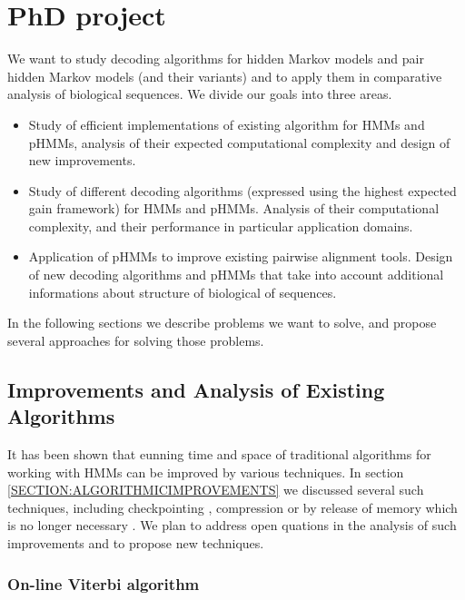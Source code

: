 \chapter{PhD project}

We want to study decoding algorithms for hidden Markov models and pair hidden
Markov models (and their variants) and to apply them in comparative analysis
of biological sequences. We divide our goals into three areas.
\begin{itemize}
\item Study of efficient implementations of existing algorithm for HMMs and
pHMMs, analysis of their expected computational complexity and design of  new
improvements.

\item Study of different decoding algorithms (expressed using the highest
expected gain framework) for HMMs and pHMMs. Analysis of their computational
complexity, and their performance in particular application domains.    

\item Application of pHMMs to improve existing pairwise alignment
tools. Design of new decoding algorithms and pHMMs that take into
account additional informations about structure of biological of sequences.
\end{itemize}
In the following sections we describe problems we want to solve, and propose several
approaches for solving those problems.


\section{Improvements and Analysis of Existing Algorithms}

It has been shown that eunning time and space of traditional algorithms for working with HMMs can be
improved by various techniques. In section \ref{SECTION:ALGORITHMICIMPROVEMENTS}
we discussed several such techniques, including checkpointing
\cite{Grice1997}, compression \cite{Lifshits2009} or by release of memory which
is no longer necessary \cite{Sramek2007}. We plan to address open quations in
the analysis of such improvements and to propose new techniques.


\subsection{On-line Viterbi algorithm}

